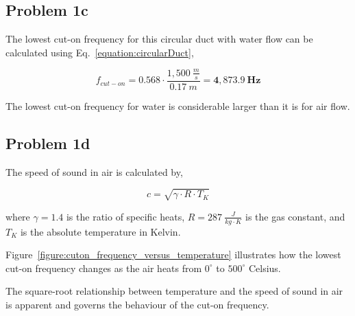 \vspace{-0.25cm}
\subsection*{Problem 1c}

The lowest cut-on frequency for this circular duct with water flow can be calculated using Eq.~\ref{equation:circularDuct},

\vspace{-0.25cm}
\begin{equation*}
    f_{cut-on} = 0.568 \cdot \frac{ 1,500~\frac{m}{s} }{ 0.17~m } = \boldsymbol{4,873.9~Hz}
\end{equation*}

The lowest cut-on frequency for water is considerable larger than it is for air flow.





\newpage
\subsection*{Problem 1d}

The speed of sound in air is calculated by,

\vspace{-0.25cm}
\begin{equation}
    c = \sqrt{ \gamma \cdot R \cdot T_K }
    \label{equation:speedOfSoundInAir}
\end{equation}

where $\gamma = 1.4$ is the ratio of specific heats, $R = 287~\frac{J}{kg \cdot K}$ is the gas constant, and $T_K$ is the absolute temperature in Kelvin.

\vspace{0.25cm}
Figure~\ref{figure:cuton_frequency_versus_temperature} illustrates how the lowest cut-on frequency changes as the air heats from $0^{\circ}$ to $500^{\circ}$ Celsius.

\vspace{0.25cm}
The square-root relationship between temperature and the speed of sound in air is apparent and governs the behaviour of the cut-on frequency.




